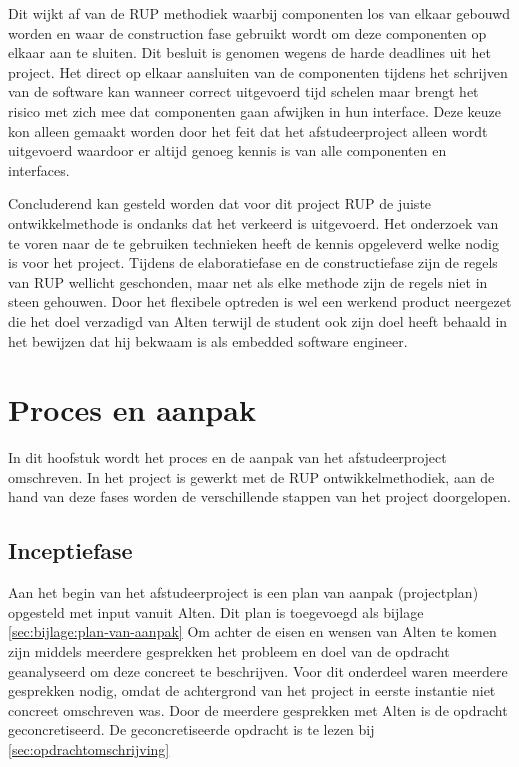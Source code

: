 \documentclass[a4paper, 11pt, oneside]{report}
\begin{document}
Dit wijkt af van de RUP methodiek waarbij componenten los van elkaar gebouwd worden en waar de construction fase gebruikt wordt om deze componenten op elkaar aan te sluiten. Dit besluit is genomen wegens de harde deadlines uit het project. Het direct op elkaar aansluiten van de componenten tijdens het schrijven van de software kan wanneer correct uitgevoerd tijd schelen maar brengt het risico met zich mee dat componenten gaan afwijken in hun interface. Deze keuze kon alleen gemaakt worden door het feit dat het afstudeerproject alleen wordt uitgevoerd waardoor er altijd genoeg kennis is van alle componenten en interfaces.

Concluderend kan gesteld worden dat voor dit project RUP de juiste ontwikkelmethode is ondanks dat het verkeerd is uitgevoerd. 
Het onderzoek van te voren naar de te gebruiken technieken heeft de kennis opgeleverd welke nodig is voor het project. Tijdens de elaboratiefase en de constructiefase zijn de regels van RUP wellicht geschonden, maar net als elke methode zijn de regels niet in steen gehouwen.
Door het flexibele optreden is wel een werkend product neergezet die het doel verzadigd van Alten terwijl de student ook zijn doel heeft behaald in het bewijzen dat hij bekwaam is als embedded software engineer. 
 

\chapter{Proces en aanpak}\label{sec:proces-en-aanpak}
In dit hoofstuk wordt het proces en de aanpak van het afstudeerproject omschreven.
In het project is gewerkt met de RUP ontwikkelmethodiek, aan de hand van deze fases worden de verschillende stappen van het project doorgelopen.

\section{Inceptiefase}\label{sec:inceptiefase}

Aan het begin van het afstudeerproject is een plan van aanpak (projectplan) opgesteld met input vanuit Alten.
Dit plan is toegevoegd als bijlage \ref{sec:bijlage:plan-van-aanpak}
Om achter de eisen en wensen van Alten te komen zijn middels meerdere gesprekken het probleem en doel van de opdracht geanalyseerd om deze concreet te beschrijven.
Voor dit onderdeel waren meerdere gesprekken nodig, omdat de achtergrond van het project in eerste instantie niet concreet omschreven was.
Door de meerdere gesprekken met Alten is de opdracht geconcretiseerd. De geconcretiseerde opdracht is te lezen bij \autoref{sec:opdrachtomschrijving} 
\end{document}
